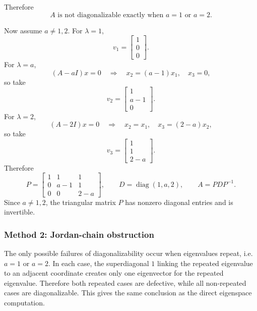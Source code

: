 \documentclass[12pt]{article}
\newcommand{\diag}{\operatorname{diag}}
\begin{document}
Therefore
\[
\boxed{A\text{ is not diagonalizable exactly when }a=1\text{ or }a=2.}
\]

Now assume $a\neq1,2$. For $\lambda=1$,
\[
v_1=\begin{bmatrix}1\\0\\0\end{bmatrix}.
\]
For $\lambda=a$,
\[
(A-aI)x=0
\quad\Longrightarrow\quad x_2=(a-1)x_1,
\quad x_3=0,
\]
so take
\[
v_2=\begin{bmatrix}1\\a-1\\0\end{bmatrix}.
\]
For $\lambda=2$,
\[
(A-2I)x=0
\quad\Longrightarrow\quad x_2=x_1,
\quad x_3=(2-a)x_2,
\]
so take
\[
v_3=\begin{bmatrix}1\\1\\2-a\end{bmatrix}.
\]
Therefore
\[
\boxed{
P=\begin{bmatrix}1&1&1\\0&a-1&1\\0&0&2-a\end{bmatrix},
\qquad
D=\diag(1,a,2),
\qquad A=PDP^{-1}.}
\]
Since $a\neq1,2$, the triangular matrix $P$ has nonzero diagonal entries and is invertible.

\subsubsection{Method 2: Jordan-chain obstruction}
The only possible failures of diagonalizability occur when eigenvalues repeat, i.e. $a=1$ or $a=2$. In each case, the superdiagonal $1$ linking the repeated eigenvalue to an adjacent coordinate creates only one eigenvector for the repeated eigenvalue. Therefore both repeated cases are defective, while all non-repeated cases are diagonalizable. This gives the same conclusion as the direct eigenspace computation.
\end{document}
